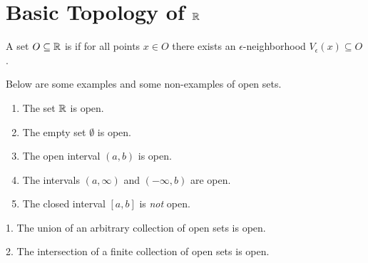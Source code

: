 \chapter{Basic Topology of $\mathbb R$}
\begin{definition}
  A set $O \subseteq \mathbb R$ is  if for all points $x \in O$
  there exists an $\epsilon$-neighborhood $V_\epsilon(x) \subseteq O$.
\end{definition}

\begin{example}
  Below are some examples and some non-examples of open sets.
  \begin{enumerate}
    \item The set $\mathbb R$ is open.
    \item The empty set $\emptyset$ is open.
    \item The open interval $(a, b)$ is open.
    \item The intervals $(a, \infty)$ and $(-\infty, b)$ are open.
    \item The closed interval $[a, b]$ is \textit{not} open.
  \end{enumerate}
\end{example}

\begin{proposition}
  1. The union of an arbitrary collection of open sets is open.

  2. The intersection of a finite collection of open sets is open.
\end{proposition}

